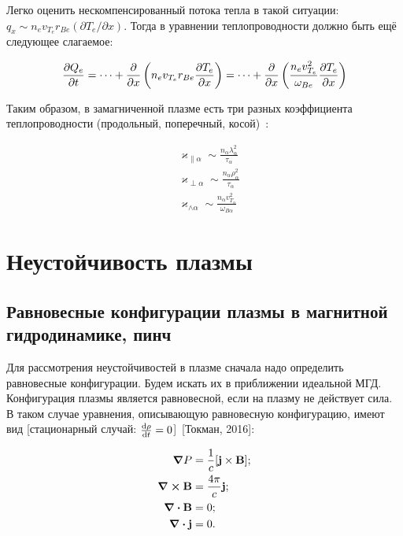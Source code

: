 \documentclass[10pt, a4paper]{article}
\newcommand{\Tokman}{~[Токман, 2016]}
\let\stdsection\section
\renewcommand\section{\newpage\stdsection}
\begin{document}
Легко оценить нескомпенсированный потока тепла в такой ситуации: $q_x \sim n_e v_{T_e} r_{Be} (\partial T_e/\partial x)$. Тогда в уравнении теплопроводности должно быть ещё следующее слагаемое:

\begin{equation*}
	\pdv{Q_e}{t} = \dots + \pdv{}{x}\left( n_e v_{T_e} r_{Be} \pdv{T_e}{x} \right) = \dots + \pdv{}{x}\left(\frac{n_e v_{T_e}^2}{\omega_{Be}}\pdv{T_e}{x} \right)
\end{equation*}

Таким образом, в замагниченной плазме есть три разных коэффициента теплопроводности (продольный, поперечный, косой)~\cite{kotelnikov}:

\begin{align*}
	&\varkappa_{\parallel\alpha} \sim \frac{n_\alpha \lambda_\alpha^2}{\tau_\alpha} \\
	&\varkappa_{\perp\alpha} \sim \frac{n_\alpha \rho_\alpha^2}{\tau_\alpha} \\
	&\varkappa_{\wedge\alpha} \sim \frac{n_\alpha v_{T_\alpha}^2}{\omega_{B\alpha}}
\end{align*}

\section{Неустойчивость плазмы}

\subsection{Равновесные конфигурации плазмы в магнитной гидродинамике, пинч}

Для рассмотрения неустойчивостей в плазме сначала надо определить равновесные конфигурации. Будем искать их в приближении идеальной МГД. Конфигурация плазмы является равновесной, если на плазму не действует сила. В таком случае уравнения, описывающую равновесную конфигурацию, имеют вид [стационарный случай: $\dv{\rho}{t}=0$]\Tokman:

\begin{align*}
	\grad{P} &= \frac{1}{c}[\vb{j}\times\vb{B}]; \\
	\curl\vb{B} &= \frac{4\pi}{c}\vb{j}; \\
	\div{\vb{B}} &= 0; \\
	\div{\vb{j}} &= 0.
\end{align*}
\end{document}
